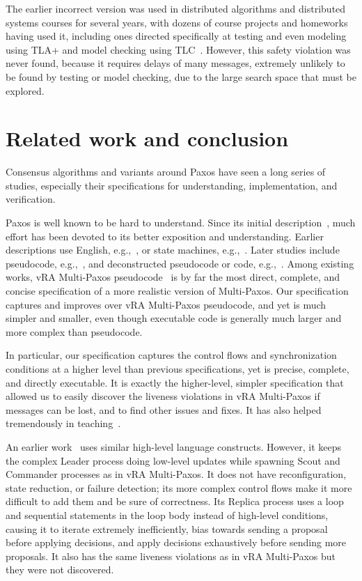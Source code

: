 \documentclass[11pt]{article}
\newcommand{\mysec}[1]{\section{#1}}
\begin{document}
{The earlier incorrect version was used in distributed algorithms and
distributed systems courses for several years,
with dozens of course projects and homeworks having used it, including ones
directed specifically at testing and even modeling using TLA+ and model
checking using TLC~\cite{tlatoolbox18}.
However, this safety violation was never found, because it requires delays
of many messages, extremely unlikely to be found by testing or model
checking, due to the large search space that must be explored.
} %


\mysec{Related work and conclusion}
\label{sec-related}

Consensus algorithms and variants around Paxos have seen a long series of
studies, especially their specifications for understanding, implementation,
and verification.

Paxos is well known to be hard to understand.  Since its initial
description~\cite{Lam98paxos}, much effort has been devoted to its better
exposition and understanding.
Earlier descriptions use English, e.g.,~\cite{lam01paxos}, or state
machines, e.g.,~\cite{lampson1996build,prisco00revisit}.  Later studies
include pseudocode, e.g.,~\cite{kirsch2008paxosTR,ongaro14raft,vra15paxos},
and deconstructed pseudocode or code,
e.g.,~\cite{boichat2003deconstructing,van15vive,garcia18paxos}.
Among existing works, vRA Multi-Paxos pseudocode~\cite{vra15paxos} is by
far the most direct, complete, and concise specification of a more
realistic version of Multi-Paxos.
Our specification captures and improves over vRA Multi-Paxos pseudocode,
and yet is much simpler and smaller, even though executable code is generally
much larger and more complex than pseudocode.

In particular, our specification captures the control flows and 
synchronization conditions
at a higher level than previous specifications, yet is precise, complete,
and directly executable.  It is exactly the higher-level, simpler
specification
that allowed us to easily
discover the liveness violations in vRA Multi-Paxos if 
messages can be lost, and to find other issues and fixes.
It has also helped tremendously in teaching~\cite{Liu+17DistPL-TOPLAS}.

An earlier work~\cite{Liu+12DistSpec-SSS} uses similar high-level language
constructs.  However, it keeps the complex Leader process doing low-level
updates while spawning Scout and Commander processes as in vRA Multi-Paxos.
It does not have reconfiguration, state reduction, or failure detection;
its more complex control flows make it more difficult to add them and be
sure of correctness.
Its Replica process uses a  loop and sequential statements in the
loop body instead of high-level  conditions, causing it to
iterate extremely inefficiently, bias towards sending a proposal before
applying decisions, and apply decisions exhaustively before sending more
proposals.  It also has the same liveness violations as in vRA Multi-Paxos
but they were not discovered.
\end{document}
